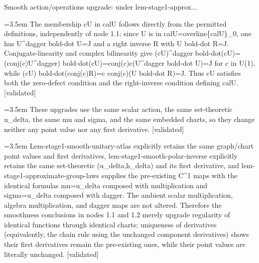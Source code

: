 \documentclass{article}
\newcommand{\step}[1]{\par\noindent\hangindent=3.5em\hangafter=1%
  \makebox[3.5em][l]{\textbf{#1.}}}
\newcommand{\steptag}[1]{\hfill{\small\textsf{[#1]}}}
\begin{document}
\begin{proofbox}{Smooth action/operations upgrade: under lem-stage1-approx...}
\step{1.3.2.1} The membership cU in calU follows directly from the permitted definitions, independently of node 1.1: since U is in calU=overline\{calU\}\_0, one has U\textasciicircum{}dagger bold-dot U=J and a right inverse R with U bold-dot R=J. Conjugate-linearity and complex bilinearity give (cU)\textasciicircum{}dagger bold-dot(cU)=(conj(c)U\textasciicircum{}dagger) bold-dot(cU)=conj(c)c(U\textasciicircum{}dagger bold-dot U)=J for c in U(1), while (cU) bold-dot(conj(c)R)=c conj(c)(U bold-dot R)=J. Thus cU satisfies both the zero-defect condition and the right-inverse condition defining calU. \steptag{validated} \\[4pt]
\step{1.4} These upgrades use the same scalar action, the same set-theoretic u\_delta, the same mu and sigma, and the same embedded charts, so they change neither any point value nor any first derivative. \steptag{validated} \\[6pt]
\step{1.4.1} Lem-stage1-smooth-unitary-atlas explicitly retains the same graph/chart point values and first derivatives, lem-stage1-smooth-polar-inverse explicitly retains the same set-theoretic (u\_delta,h\_delta) and its first derivative, and lem-stage1-approximate-group-laws supplies the pre-existing C\textasciicircum{}1 maps with the identical formulas mu=u\_delta composed with multiplication and sigma=u\_delta composed with dagger. The ambient scalar multiplication, algebra multiplication, and dagger maps are not altered. Therefore the smoothness conclusions in nodes 1.1 and 1.2 merely upgrade regularity of identical functions through identical charts; uniqueness of derivatives (equivalently, the chain rule using the unchanged component derivatives) shows their first derivatives remain the pre-existing ones, while their point values are literally unchanged. \steptag{validated} \\[4pt]
\end{proofbox}
\end{document}
